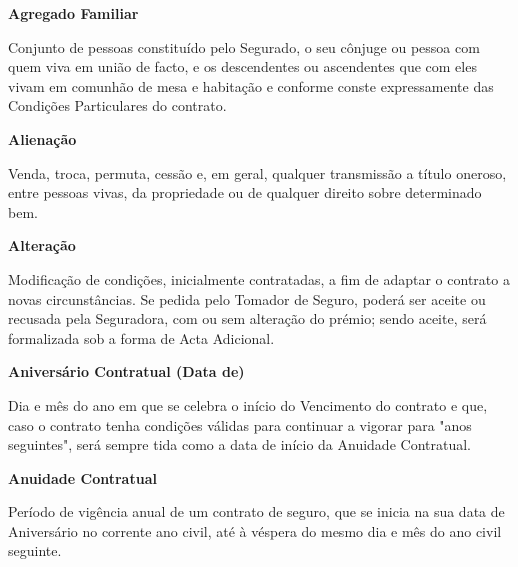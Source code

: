 \begin{description}
\item \textbf{Agregado Familiar}

Conjunto de pessoas constituído pelo Segurado, o seu cônjuge ou pessoa com quem viva em união de facto, e os descendentes ou ascendentes que com eles vivam em comunhão de mesa e habitação e conforme conste expressamente das Condições Particulares do contrato.
\end{description}

\begin{description}
\item \textbf{Alienação}

Venda, troca, permuta, cessão e, em geral, qualquer transmissão a título oneroso, entre pessoas vivas, da propriedade ou de qualquer direito sobre determinado bem.
\end{description}

\begin{description}
\item \textbf{Alteração}

Modificação de condições, inicialmente contratadas, a fim de adaptar o contrato a novas circunstâncias. Se pedida pelo Tomador de Seguro, poderá ser aceite ou recusada pela Seguradora, com ou sem alteração do prémio; sendo aceite, será formalizada sob a forma de Acta Adicional.
\end{description}

\begin{description}
\item \textbf{Aniversário Contratual (Data de)}

Dia e mês do ano em que se celebra o início do Vencimento do contrato e que, caso o contrato tenha condições válidas para continuar a vigorar para "anos seguintes", será sempre tida como a data de início da Anuidade Contratual.
\end{description}

\begin{description}
\item \textbf{Anuidade Contratual}

Período de vigência anual de um contrato de seguro, que se inicia na sua data de Aniversário no corrente ano civil, até à véspera do mesmo dia e mês do ano civil seguinte.
\end{description}

